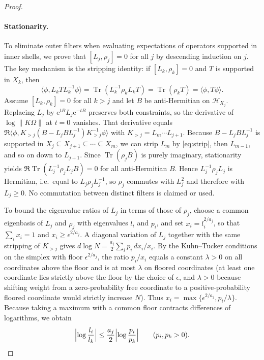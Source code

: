 \documentclass[aps,prx,reprint,superscriptaddress,floatfix,nofootinbib,longbibliography,amsmath,amssymb]{revtex4-2}
\newcommand{\Tr}{\operatorname{Tr}}
\newcommand{\norm}[1]{\lVert #1\rVert}
\newcommand{\cH}{\mathcal H}
\newcommand{\Om}{\Omega}
\newcommand{\e}{\mathrm e}
\theoremstyle{plain}
\theoremstyle{definition}
\begin{document}
\begin{proof}
\paragraph{Stationarity.}
To eliminate outer filters when evaluating expectations of operators
supported in inner shells, we prove that $[L_j,\rho_j]=0$ for all $j$ by
descending induction on $j$. The key mechanism is the stripping identity:
if $[L_k,\rho_k]=0$ and $T$ is supported in $X_k$, then
\begin{equation}\label{eq:strip}
 \langle\phi,L_kTL_k^{-1}\phi\rangle=\Tr(L_k^{-1}\rho_kL_kT)=\Tr(\rho_kT)=\langle\phi,T\phi\rangle .
\end{equation}
Assume $[L_k,\rho_k]=0$ for all $k>j$ and let $B$ be anti-Hermitian on
$\cH_{X_j}$. Replacing $L_j$ by $\e^{tB}L_j\e^{-tB}$ preserves both
constraints, so the derivative of $\log\norm{K\Om}$ at $t=0$ vanishes.
That derivative equals
$\Re\langle\phi,K_{>j}(B-L_jBL_j^{-1})K_{>j}^{-1}\phi\rangle$ with
$K_{>j}=L_m\cdots L_{j+1}$. Because $B-L_jBL_j^{-1}$ is supported in
$X_j\subseteq X_{j+1}\subseteq\cdots\subseteq X_m$, we can strip $L_m$ by
\eqref{eq:strip}, then $L_{m-1}$, and so on down to $L_{j+1}$. Since
$\Tr(\rho_jB)$ is purely imaginary, stationarity yields
$\Re\Tr(L_j^{-1}\rho_jL_jB)=0$ for all anti-Hermitian $B$. Hence
$L_j^{-1}\rho_jL_j$ is Hermitian, i.e.\ equal to $L_j\rho_jL_j^{-1}$, so
$\rho_j$ commutes with $L_j^2$ and therefore with $L_j\ge0$. No
commutation between distinct filters is claimed or used.

To bound the eigenvalue ratios of $L_j$ in terms of those of $\rho_j$,
choose a common eigenbasis of $L_j$ and $\rho_j$ with eigenvalues $l_i$
and $p_i$, and set $x_i=l_i^{2/a_j}$, so that $\sum_ix_i=1$ and
$x_i\ge\epsilon^{2/a_j}$. A diagonal variation of $L_j$ together with the
same stripping of $K_{>j}$ gives
$d\log N=\frac{a_j}2\sum_ip_i\,dx_i/x_i$. By the Kuhn--Tucker conditions
on the simplex with floor $\epsilon^{2/a_j}$, the ratio $p_i/x_i$ equals a
constant $\lambda>0$ on all coordinates above the floor and is at most
$\lambda$ on floored coordinates (at least one coordinate lies strictly
above the floor by the choice of $\epsilon$, and $\lambda>0$ because
shifting weight from a zero-probability free coordinate to a
positive-probability floored coordinate would strictly increase $N$). Thus
$x_i=\max\{\epsilon^{2/a_j},p_i/\lambda\}$. Because taking a maximum with
a common floor contracts differences of logarithms, we obtain
\begin{equation}\label{eq:clip}
 \Bigl|\log\frac{l_i}{l_k}\Bigr|\le\frac{a_j}{2}\Bigl|\log\frac{p_i}{p_k}\Bigr|
 \qquad(p_i,p_k>0).
\end{equation}


\end{proof}
\end{document}

